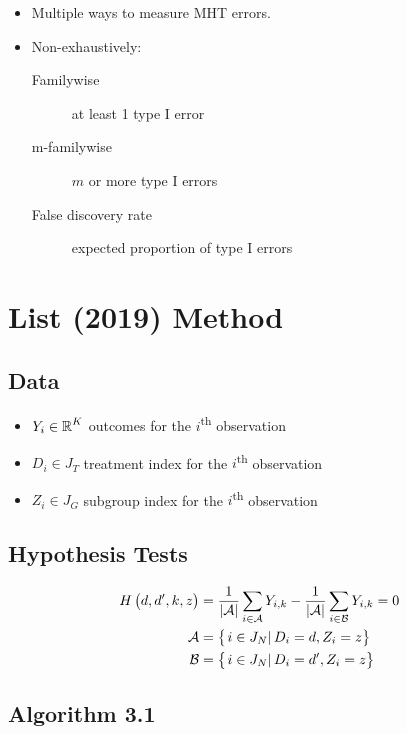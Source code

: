 \documentclass[10pt]{article}
\begin{document}
	\begin{itemize}
		\item Multiple ways to measure MHT errors.
		\item Non-exhaustively:
		\begin{description}
			\item[Familywise] at least 1 type I error
			\item[m-familywise] $m$ or more type I errors
			\item[False discovery rate] expected proportion of type I errors
		\end{description}
	\end{itemize}

	\section{List (2019) Method}

	\subsection{Data}

	\begin{itemize}
		\item $Y_i\in \operatorname{\mathbb{R}}^K$ outcomes for the $i$\textsuperscript{th} observation
		\item $D_i\in J_T$ treatment index for the $i$\textsuperscript{th} observation
		\item $Z_i\in J_G$ subgroup index for the $i$\textsuperscript{th} observation
	\end{itemize}

	\subsection{Hypothesis Tests}

	\begin{align*}
		\hypTest{d,d^\prime,k,z} &= \frac{1}{\wrapAbs{\mathcal{A}}}\sum_{i\in\mathcal{A}} Y_{i,k} - \frac{1}{\wrapAbs{\mathcal{A}}}\sum_{i\in\mathcal{B}} Y_{i,k} = 0 \\
		\mathcal{A} &= \set{i\in J_N}{D_i=d, Z_i=z} \\
		\mathcal{B} &= \set{i\in J_N}{D_i=d^\prime, Z_i=z}
	\end{align*}

	\subsection{Algorithm 3.1}
\end{document}
